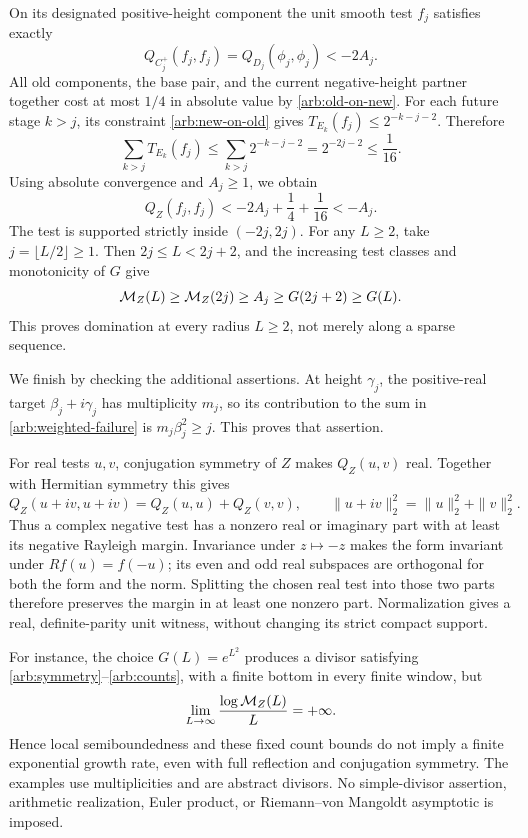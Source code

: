 On its designated positive-height component the unit smooth
test \(f_j\) satisfies exactly
\begin{equation}\label{arb:own-component}
 Q_{C_j^+}(f_j,f_j)=Q_{D_j}(\phi_j,\phi_j)<-2A_j.
\end{equation}
All old components, the base pair, and the current
negative-height partner together cost at most \(1/4\) in
absolute value by \eqref{arb:old-on-new}. For each future
stage \(k>j\), its constraint \eqref{arb:new-on-old} gives
\(T_{E_k}(f_j)\le2^{-k-j-2}\). Therefore
\begin{equation}\label{arb:future-tail}
 \sum_{k>j}T_{E_k}(f_j)
 \le\sum_{k>j}2^{-k-j-2}=2^{-2j-2}\le\frac1{16}.
\end{equation}
Using absolute convergence and \(A_j\ge1\), we obtain
\begin{equation}\label{arb:surviving-witness}
 Q_Z(f_j,f_j)<-2A_j+\frac14+\frac1{16}<-A_j.
\end{equation}
The test is supported strictly inside \((-2j,2j)\).
For any \(L\ge2\), take \(j=\lfloor L/2\rfloor\ge1\).
Then \(2j\le L<2j+2\), and the increasing test classes and
monotonicity of \(G\) give
\[
 \mathcal M_Z(L)\ge\mathcal M_Z(2j)\ge A_j
                  \ge G(2j+2)\ge G(L).
\]
This proves domination at every radius \(L\ge2\), not merely
along a sparse sequence.

We finish by checking the additional assertions. At height
\(\gamma_j\), the positive-real target
\(\beta_j+i\gamma_j\) has multiplicity \(m_j\), so its
contribution to the sum in \eqref{arb:weighted-failure} is
\(m_j\beta_j^2\ge j\). This proves that assertion.

For real tests \(u,v\), conjugation symmetry of \(Z\) makes
\(Q_Z(u,v)\) real. Together with Hermitian symmetry this gives
\[
 Q_Z(u+iv,u+iv)=Q_Z(u,u)+Q_Z(v,v),\qquad
 \|u+iv\|_2^2=\|u\|_2^2+\|v\|_2^2.
\]
Thus a complex negative test has a nonzero real or imaginary
part with at least its negative Rayleigh margin. Invariance
under \(z\mapsto-z\) makes the form invariant under
\(Rf(u)=f(-u)\); its even and odd real subspaces are
orthogonal for both the form and the norm. Splitting the
chosen real test into those two parts therefore preserves
the margin in at least one nonzero part. Normalization gives
a real, definite-parity unit witness, without changing its
strict compact support.

For instance, the choice \(G(L)=e^{L^2}\) produces a divisor
satisfying \eqref{arb:symmetry}--\eqref{arb:counts}, with a
finite bottom in every finite window, but
\[
 \lim_{L\to\infty}\frac{\log\mathcal M_Z(L)}{L}=+\infty.
\]
Hence local semiboundedness and these fixed count bounds do
not imply a finite exponential growth rate, even with full
reflection and conjugation symmetry. The examples use
multiplicities and are abstract divisors. No simple-divisor
assertion, arithmetic realization, Euler product, or
Riemann--von Mangoldt asymptotic is imposed.
